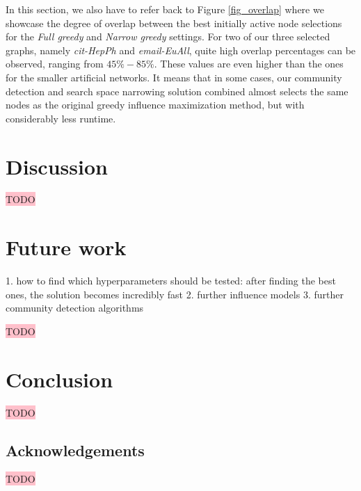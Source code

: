 \documentclass[pdflatex,sn-mathphys-num]{sn-jnl}
\begin{document}
In this section, we also have to refer back to Figure \ref{fig_overlap} where we showcase the degree of overlap between the best initially active node selections for the \textit{Full greedy} and \textit{Narrow greedy} settings. For two of our three selected graphs, namely \textit{cit-HepPh} and \textit{email-EuAll}, quite high overlap percentages can be observed, ranging from $45\%-85\%$. These values are even higher than the ones for the smaller artificial networks. It means that in some cases, our community detection and search space narrowing solution combined almost selects the same nodes as the original greedy influence maximization method, but with considerably less runtime.


\section{Discussion}\label{sec_discussion}

\colorbox{pink}{TODO}


\section{Future work}\label{sec_future}

1. how to find which hyperparameters should be tested: after finding the best ones, the solution becomes incredibly fast
2. further influence models
3. further community detection algorithms

\colorbox{pink}{TODO}


\section{Conclusion}\label{sec_conclusion}

\colorbox{pink}{TODO}


\subsection*{Acknowledgements}\label{subsec_acknowledgements}

\colorbox{pink}{TODO}



\end{document}
